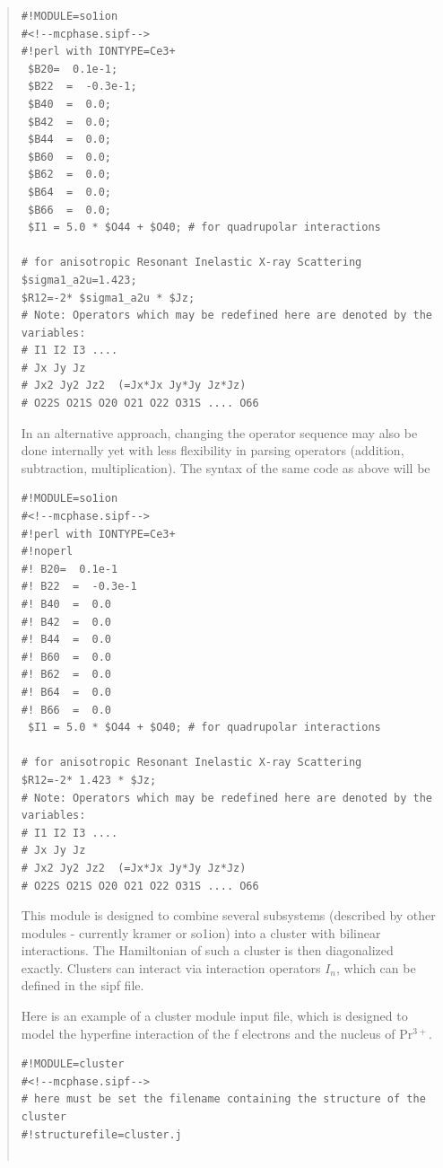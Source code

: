 \begin{quote}
\begin{verbatim}
#!MODULE=so1ion
#<!--mcphase.sipf-->
#!perl with IONTYPE=Ce3+
 $B20=  0.1e-1;                                       
 $B22  =  -0.3e-1;
 $B40  =  0.0;
 $B42  =  0.0;
 $B44  =  0.0;
 $B60  =  0.0;
 $B62  =  0.0;
 $B64  =  0.0;
 $B66  =  0.0;
 $I1 = 5.0 * $O44 + $O40; # for quadrupolar interactions

# for anisotropic Resonant Inelastic X-ray Scattering
$sigma1_a2u=1.423;
$R12=-2* $sigma1_a2u * $Jz;
# Note: Operators which may be redefined here are denoted by the variables:
# I1 I2 I3 ....
# Jx Jy Jz
# Jx2 Jy2 Jz2  (=Jx*Jx Jy*Jy Jz*Jz)
# O22S O21S O20 O21 O22 O31S .... O66
\end{verbatim}

In an alternative approach, changing the operator sequence may also be done internally
yet with less flexibility in parsing operators (addition, subtraction, multiplication).
The syntax of the same code as above will be

\begin{verbatim}
#!MODULE=so1ion
#<!--mcphase.sipf-->
#!perl with IONTYPE=Ce3+
#!noperl
#! B20=  0.1e-1                                       
#! B22  =  -0.3e-1
#! B40  =  0.0
#! B42  =  0.0
#! B44  =  0.0
#! B60  =  0.0
#! B62  =  0.0
#! B64  =  0.0
#! B66  =  0.0
 $I1 = 5.0 * $O44 + $O40; # for quadrupolar interactions

# for anisotropic Resonant Inelastic X-ray Scattering
$R12=-2* 1.423 * $Jz;
# Note: Operators which may be redefined here are denoted by the variables:
# I1 I2 I3 ....
# Jx Jy Jz
# Jx2 Jy2 Jz2  (=Jx*Jx Jy*Jy Jz*Jz)
# O22S O21S O20 O21 O22 O31S .... O66
\end{verbatim}

\item[{\prg cluster\index{cluster}}]
This module is designed to combine several subsystems (described
by other modules - currently kramer or so1ion) into a cluster with bilinear
interactions. The Hamiltonian of such a cluster is then
diagonalized exactly. Clusters can interact via interaction operators
$I_n$, which can be defined in the sipf file. 

Here is an example of a cluster module input file, which is designed
to model the hyperfine interaction of the f electrons and the nucleus
of Pr$^{3+}$.

\begin{verbatim}
#!MODULE=cluster
#<!--mcphase.sipf-->
# here must be set the filename containing the structure of the cluster
#!structurefile=cluster.j


\end{verbatim}
\end{quote}

